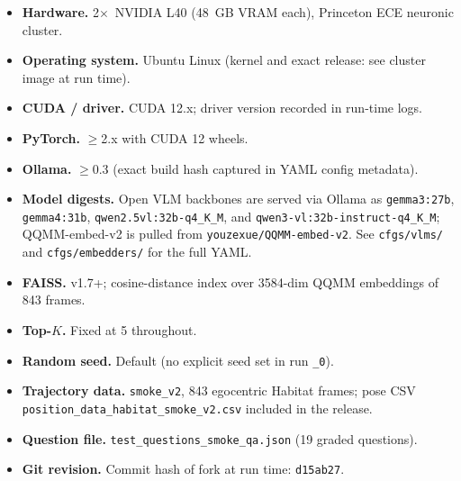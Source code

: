 \documentclass[12pt,letterpaper,oneside]{article}
\begin{document}
\begin{itemize}\setlength\itemsep{0pt}
  \item \textbf{Hardware.}  2$\times$~NVIDIA L40 (48~GB VRAM each),
    Princeton ECE neuronic cluster.
  \item \textbf{Operating system.}  Ubuntu Linux (kernel and exact
    release: see cluster image at run time).
  \item \textbf{CUDA / driver.}  CUDA 12.x; driver version recorded in
    run-time logs.
  \item \textbf{PyTorch.}  $\ge$2.x with CUDA 12 wheels.
  \item \textbf{Ollama.}  $\ge$0.3 (exact build hash captured in YAML
    config metadata).
  \item \textbf{Model digests.}  Open VLM backbones are served via
    Ollama as \texttt{gemma3:27b}, \texttt{gemma4:31b},
    \texttt{qwen2.5vl:32b-q4\_K\_M}, and
    \texttt{qwen3-vl:32b-instruct-q4\_K\_M}; QQMM-embed-v2 is pulled
    from \texttt{youzexue/QQMM-embed-v2}.  See \texttt{cfgs/vlms/}
    and \texttt{cfgs/embedders/} for the full YAML.
  \item \textbf{FAISS.}  v1.7+; cosine-distance index over 3584-dim
    QQMM embeddings of 843 frames.
  \item \textbf{Top-$K$.}  Fixed at 5 throughout.
  \item \textbf{Random seed.}  Default (no explicit seed set in run
    \texttt{\_0}).
  \item \textbf{Trajectory data.}  \texttt{smoke\_v2}, 843 egocentric
    Habitat frames; pose CSV
    \texttt{position\_data\_habitat\_smoke\_v2.csv} included in the
    release.
  \item \textbf{Question file.}
    \texttt{test\_questions\_smoke\_qa.json} (19 graded questions).
  \item \textbf{Git revision.}  Commit hash of fork at run time:
    \texttt{d15ab27}.
\end{itemize}
\end{document}
